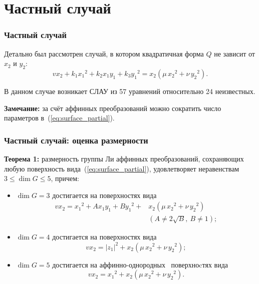 \documentclass[russian,hyperref={unicode}]{beamer}
\begin{document}
\section{Частный случай}
\frame
{
	\frametitle{Частный случай}
	Детально был рассмотрен случай, в котором квадратичная форма $Q$ не зависит от $x_2$
   и $y_2$:
	\begin{equation}\label{eq:surface_partial}
	v x_2 + k_1 {x_1}^2 + k_2 x_1 y_1 + k_3 {y_1}^2 = x_2 (\mu\,{x_2}^2 + \nu\,{y_2}^2).
	\end{equation}

	В данном случае возникает СЛАУ из 57 уравнений относительно 24 неизвестных.

	\textbf{Замечание:}
	за счёт аффинных преобразований можно сократить число параметров в~(\ref{eq:surface_partial}).
}
\frame
{
	\frametitle{Частный случай: оценка размерности}
	\textbf{Теорема 1:}
	размерность группы Ли аффинных преобразований, сохраняющих любую
	поверхность вида~(\ref{eq:surface_partial}), удовлетворяет неравенствам
	$ 3 \le \dim G \le 5$, причем:
	\begin{itemize}
		\item $\dim G = 3$ достигается на поверхностях вида
		\begin{align}\label{eq:dim3}
			v x_2 = {x_1}^2 + A x_1 y_1 + B {y_1}^2 + &x_2 (\mu\,{x_2}^2 + \nu\, {y_2}^2) \nonumber\\
			&(A \ne 2 \sqrt{B},\ B\ne 1);
		\end{align}
		\item $\dim G = 4$ достигается на поверхностях вида
		\begin{equation}\label{eq:dim4}
			v x_2 = {|z_1|}^2 + x_2 (\mu\,{x_2}^2 + \nu\,{y_2}^2);
		\end{equation}
		\item $\dim G = 5$ достигается на аффинно-однородных~\cite{arxiv} поверхноcтях вида
		\begin{equation}\label{eq:dim5}
			v x_2 = {x_1}^2 + x_2 (\mu\,{x_2}^2 + \nu\,{y_2}^2).
		\end{equation}
	\end{itemize}
}
\frame
\end{document}
